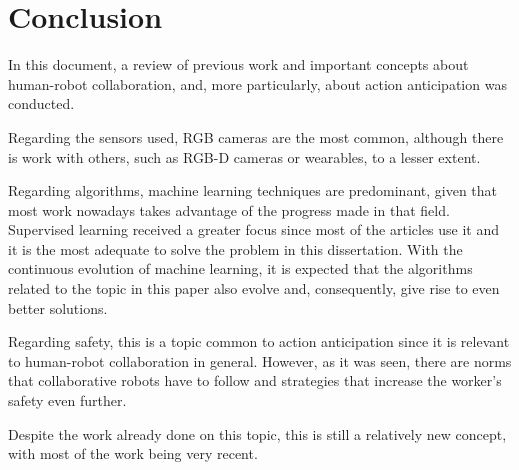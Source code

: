 \chapter{Conclusion}
\label{chapter:conclusion}

In this document, a review of previous work and important concepts about human-robot collaboration, and, more particularly, about action anticipation was conducted.

Regarding the sensors used, RGB cameras are the most common, although there is work with others, such as RGB-D cameras or wearables, to a lesser extent.

Regarding algorithms, machine learning techniques are predominant, given that most work nowadays takes advantage of the progress made in that field. Supervised learning received a greater focus since most of the articles use it and it is the most adequate to solve the problem in this dissertation. With the continuous evolution of machine learning, it is expected that the algorithms related to the topic in this paper also evolve and, consequently, give rise to even better solutions.

Regarding safety, this is a topic common to action anticipation since it is relevant to human-robot collaboration in general. However, as it was seen, there are norms that collaborative robots have to follow and strategies that increase the worker's safety even further.

Despite the work already done on this topic, this is still a relatively new concept, with most of the work being very recent.